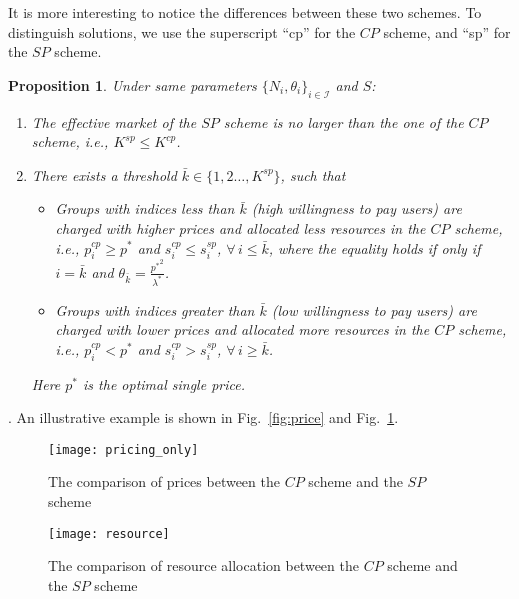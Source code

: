 \documentclass[twocolumn,10pt,twosided]{IEEEtran}
\newtheorem{proposition}{Proposition}
\newcommand{\ie}{\emph{i.e., }}
\begin{document}
It is more interesting to notice the differences between these two schemes.  To distinguish solutions, we use the superscript ``cp'' for the $CP$ scheme, and ``sp'' for the $SP$ scheme.
\begin{proposition}
\label{pro:comparison_sp_cd}
Under same parameters $\{N_i,\theta_i\}_{i\in \mathcal{I}}$ and $S$:
\begin{enumerate}
    \item The effective market of the $SP$ scheme is no larger than the one of the $CP$ scheme, i.e.,
    $K^{sp}\le K^{cp}$.
     \item
There exists a threshold $\bar{k}\in\{1,2\dots,K^{sp}\}$, such that 
\begin{itemize}
    \item  Groups with indices less than $\bar{k}$ ({high} willingness to pay users) are charged with higher prices and allocated less resources in {the $CP$ scheme}, \ie
$p^{cp}_i\ge p^*$ and $s^{cp}_i\le s^{sp}_i$, $\forall\,i\le \bar{k}$,  where the equality holds if only if $i=\bar{k}$ and $\theta_{\bar{k}}=\frac{{p^*}^2}{\lambda^*}$.
     \item Groups with indices greater than $\bar{k}$ ({low} willingness to pay users) are charged with lower prices and allocated more resources {in the $CP$ scheme}, \ie
$p^{cp}_i< p^*$ and $s^{cp}_i> s^{sp}_i$, $\forall\,i\ge \bar{k}$.
\end{itemize}
Here $p^*$ is the optimal single price.
\end{enumerate}
\end{proposition}
. An illustrative example is shown in Fig.~\ref{fig:price} and Fig.~\ref{fig:resource}.
\begin{figure}[ht]
\centering
\texttt{[image: pricing\_only]}
\caption{The comparison of prices between the $CP$ scheme and the $SP$ scheme} \label{fig:price}
\texttt{[image: resource]}
\caption{The comparison of resource allocation between the $CP$ scheme and the $SP$ scheme}
\label{fig:resource}
\end{figure}
\end{document}
